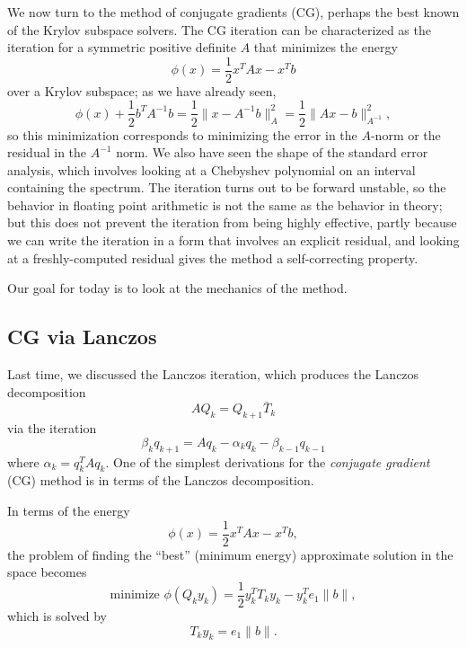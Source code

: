 \documentclass[12pt, leqno]{article} %
\begin{document}
We now turn to the method of conjugate gradients (CG), perhaps the
best known of the Krylov subspace solvers.  The CG iteration can be
characterized as the iteration for a symmetric positive definite
$A$ that minimizes the energy
\[
  \phi(x) = \frac{1}{2} x^T A x - x^T b
\]
over a Krylov subspace; as we have already seen,
\[
  \phi(x) + \frac{1}{2} b^T A^{-1} b
  = \frac{1}{2} \|x-A^{-1} b\|_A^2
  = \frac{1}{2} \|Ax-b\|_{A^{-1}}^2,
\]
so this minimization corresponds to minimizing the error in the $A$-norm
or the residual in the $A^{-1}$ norm.  We also have seen the shape of
the standard error analysis, which involves looking at a Chebyshev
polynomial on an interval containing the spectrum.  The iteration turns
out to be forward unstable, so the behavior in floating point arithmetic
is not the same as the behavior in theory; but this does not prevent
the iteration from being highly effective, partly because we can
write the iteration in a form that involves an explicit residual,
and looking at a freshly-computed residual gives the method a
self-correcting property.

Our goal for today is to look at the mechanics of the method.

\subsection{CG via Lanczos}

Last time, we discussed the Lanczos iteration, which produces the
Lanczos decomposition
\[
  A Q_k = Q_{k+1} \bar{T}_k
\]
via the iteration
\[
  \beta_k q_{k+1} = A q_k - \alpha_k q_k - \beta_{k-1} q_{k-1}
\]
where $\alpha_k = q_k^T A q_k$.  One of the simplest derivations
for the {\em conjugate gradient} (CG) method is in terms of the
Lanczos decomposition.

In terms of the energy
\[
  \phi(x) = \frac{1}{2} x^T A x - x^T b,
\]
the problem of finding the ``best'' (minimum energy) approximate
solution in the space becomes
\[
  \mbox{minimize } \phi(Q_k y_k) = \frac{1}{2} y_k^T T_k y_k - y_k^T e_1 \|b\|,
\]
which is solved by
\[
  T_k y_k = e_1 \|b\|.
\]
\end{document}
